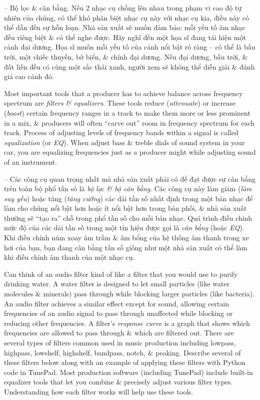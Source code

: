 \documentclass{article}
\begin{document}
\begin{itemize}
\begin{itemize}
		-- {\sf Bộ lọc \& cân bằng.} Nếu 2 nhạc cụ chồng lên nhau trong phạm vi cao độ tự nhiên của chúng, có thể khó phân biệt nhạc cụ này với nhạc cụ kia, điều này có thể dẫn đến sự hỗn loạn. Nhà sản xuất sẽ muốn đảm bảo: mỗi yếu tố âm nhạc đều riêng biệt \& có thể nghe được. Hãy nghĩ đến một họa sĩ đang tái hiện một cảnh đại dương. Họa sĩ muốn mỗi yếu tố của cảnh nổi bật rõ ràng -- có thể là bầu trời, một chiếc thuyền, bờ biển, \& chính đại dương. Nếu đại dương, bầu trời, \& đất liền đều có cùng một sắc thái xanh, người xem sẽ không thể diễn giải \& đánh giá cao cảnh đó.
		
		Most important tools that a producer has to achieve balance across frequency spectrum are {\it filters \& equalizers}. These tools reduce ({\it attenuate}) or increase ({\it boost}) certain frequency ranges in a track to make them more or less prominent in a mix, \& producers will often ``carve out'' room in frequency spectrum for each track. Process of adjusting levels of frequency bands within a signal is called {\it equalization} (or {\it EQ}). When adjust bass \& treble dials of sound system in your car, you are equalizing frequencies just as a producer might while adjusting sound of an instrument.
		
		-- Các công cụ quan trọng nhất mà nhà sản xuất phải có để đạt được sự cân bằng trên toàn bộ phổ tần số là {\it bộ lọc \& bộ cân bằng}. Các công cụ này làm giảm ({\it làm suy yếu}) hoặc tăng ({\it tăng cường}) các dải tần số nhất định trong một bản nhạc để làm cho chúng nổi bật hơn hoặc ít nổi bật hơn trong bản phối, \& nhà sản xuất thường sẽ ``tạo ra'' chỗ trong phổ tần số cho mỗi bản nhạc. Quá trình điều chỉnh mức độ của các dải tần số trong một tín hiệu được gọi là {\it cân bằng} (hoặc {\it EQ}). Khi điều chỉnh núm xoay âm trầm \& âm bổng của hệ thống âm thanh trong xe hơi của bạn, bạn đang cân bằng tần số giống như một nhà sản xuất có thể làm khi điều chỉnh âm thanh của một nhạc cụ.
		
		Can think of an audio filter kind of like a filter that you would use to purify drinking water. A water filter is designed to let small particles (like water molecules \& minerals) pass through while blocking larger particles (like bacteria). An audio filter achieves a similar effect except for sound, allowing certain frequencies of an audio signal to pass through unaffected while blocking or reducing other frequencies. A filter's {\it response curve} is a graph that shows which frequencies are allowed to pass through \& which are filtered out. There are several types of filters common used in music production including lowpass, highpass, lowshelf, highshelf, bandpass, notch, \& peaking. Describe several of these filters below along with an example of applying these filters with Python code in TunePad. Most production software (including TunePad) include built-in equalizer tools that let you combine \& precisely adjust various filter types. Understanding how each filter works will help use these tools.
		

\end{itemize}
\end{itemize}
\end{document}
